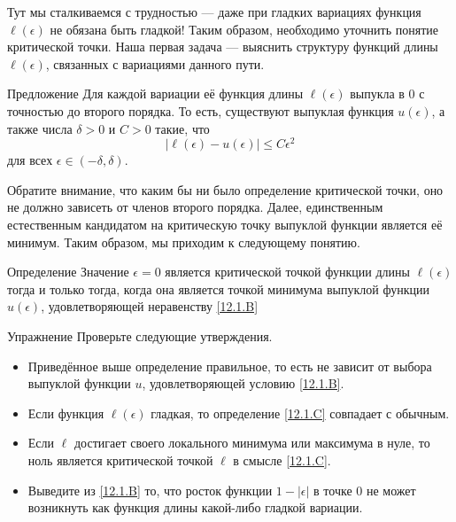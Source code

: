 Тут мы сталкиваемся с трудностью — даже при гладких вариациях функция $\ell(\epsilon)$ не обязана быть гладкой!
Таким образом, необходимо уточнить понятие критической точки.
Наша первая задача — выяснить структуру функций длины
$\ell(\epsilon)$, связанных с вариациями данного пути. 


\begin{ex}{Предложение}\label{12.1.B}
Для каждой вариации её функция длины $\ell(\epsilon)$ выпукла в $0$ с точностью до
второго порядка. 
То есть, существуют выпуклая функция $u(\epsilon)$, а также числа
$\delta > 0$ и $C > 0$ такие, что  
\[|\ell(\epsilon) - u(\epsilon)| \le C\epsilon^2\]
для всех $\epsilon \in (-\delta, \delta)$.
\end{ex}

Обратите внимание, что каким бы ни было определение критической точки,
оно не должно зависеть от членов второго порядка. 
Далее, единственным естественным кандидатом на критическую точку выпуклой
функции является её минимум. 
Таким образом, мы приходим к следующему понятию.

\begin{ex}{Определение}\label{12.1.C}
Значение $\epsilon = 0$ является критической точкой функции длины $\ell(\epsilon)$ тогда и только тогда, когда она является точкой минимума выпуклой функции $u(\epsilon)$, удовлетворяющей неравенству \ref{12.1.B}
\end{ex}

\begin{ex}{Упражнение}\label{12.1.D}
Проверьте следующие утверждения.
\begin{itemize}

\item Приведённое выше определение правильное, то есть не зависит от выбора выпуклой функции $u$, удовлетворяющей условию \ref{12.1.B}.


\item Если функция $\ell(\epsilon)$ гладкая, то определение \ref{12.1.C} совпадает с обычным.


\item Если $\ell$ достигает своего локального минимума или максимума в
  нуле, то ноль является критической точкой $\ell$ в смысле
  \ref{12.1.C}. 


\item Выведите из \ref{12.1.B} то, что росток функции $1 - |\epsilon|$
  в точке $0$ не может возникнуть как функция длины какой-либо гладкой
  вариации.
\end{itemize}
\end{ex}

